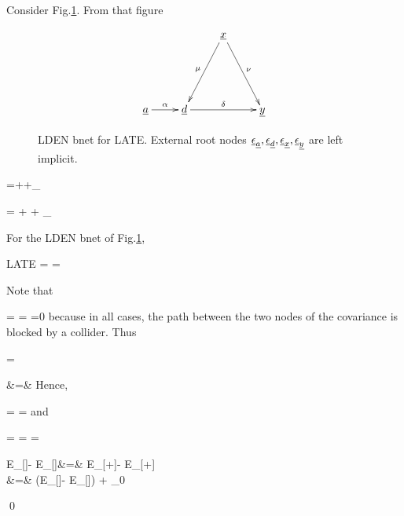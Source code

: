  Consider Fig.\ref{fig-late-lden}.
 From that figure

\begin{figure}[h!]
$$
\xymatrix{
&&\rvx\ar[ddl]_\mu
\ar[ddr]^\nu
\\
\\
\rva\ar[r]^\alp
&\rvd\ar[rr]^\delta
&&\rvy
}
$$
\caption{
LDEN bnet for LATE.
External root nodes 
$\rveps_\rva, \rveps_\rvd,
\rveps_\rvx, \rveps_\rvy$ are left implicit.}
\label{fig-late-lden}
\end{figure}

\beq
\rvd=\alp\rva +\mu\rvx +\rveps_\rvd
\eeq

\beq
\rvy = \delta \rvd + \nu\rvx + \rveps_\rvy
\eeq

\begin{claim}
For the LDEN bnet of Fig.\ref{fig-late-lden},

\beq
LATE = \delta =
\frac{\pder{\rvy}{\rva}}{\pder{\rvd}{\rva}}
\eeq
\end{claim}
\proof

Note that

\beq
\av{\rva, \rvx}=\av{\rva, \rveps_\rvd}
=
\av{\rva,\rveps_\rvy}=0
\eeq
because 
in all cases, the path
between the two nodes of the covariance 
is blocked by a collider. Thus


\beq
\av{\rva, \rvd}=\alp
\av{\rva, \rva}
\eeq

\beqa
\av{\rva, \rvy}
&=&
\delta
\av{\rva, \rvd} 
\eeqa
Hence,

\beq
\alp=
\frac{\av{\rva, \rvd}}
{\av{\rva, \rva}}=
\pder{\rvd}{\rva}
\eeq
and

\beq
\delta=
\frac{\av{\rva,\rvy}}
{\av{\rva, \rvd}}=
\frac{\av{\rva,\rvy}}
{\av{\rva, \rva}}
\frac{\av{\rva, \rva}}{\av{\rva, \rvd}}
=
\frac{\pder{\rvy}{\rva}}{\pder{\rvd}{\rva}}
\eeq

\beqa
E_{}[\rvy]-
E_{}[\rvy]&=&
E_{}[\delta \rvd +\nu\rvx]-
E_{}[\delta \rvd +\nu\rvx]
\\
&=&
\delta(E_{}[\rvd]-
E_{}[\rvd])
+ \nu
{}_{0}
\eeqa

\qed

